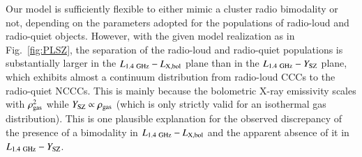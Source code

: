 \documentclass[useAMS,usenatbib]{mn2e}
\begin{document}
Our model is sufficiently flexible to either mimic a cluster radio bimodality or
not, depending on the parameters adopted for the populations of radio-loud and
radio-quiet objects. However, with the given model realization as in
Fig.~\ref{fig:PLSZ}, the separation of the radio-loud and radio-quiet
populations is substantially larger in the $L_{1.4~{\mathrm{GHz}}}-L_{{\mathrm{X,bol}}}$
plane than in the $L_{1.4~{\mathrm{GHz}}}-Y_{{\mathrm{SZ}}}$ plane, which exhibits almost
a continuum distribution from radio-loud CCCs to the radio-quiet NCCCs. This is
mainly because the bolometric X-ray emissivity scales with $\rho_{{\mathrm{gas}}}^2$
while $Y_{{\mathrm{SZ}}}\propto\rho_{{\mathrm{gas}}}$ (which is only strictly valid for an
isothermal gas distribution).  This is one plausible explanation for the
observed discrepancy of the presence of a bimodality in
$L_{1.4~{\mathrm{GHz}}}-L_{{\mathrm{X,bol}}}$ and the apparent absence of it in
$L_{1.4~{\mathrm{GHz}}}-Y_{{\mathrm{SZ}}}$.
\end{document}
